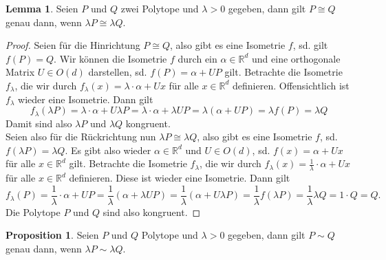 \documentclass[11pt,titlepage]{article}
\newcommand{\setR}{\mathbb{R}}
\theoremstyle{definition}
\newtheorem{proposition}[theorem]{Proposition}
\newtheorem{lemma}[theorem]{Lemma}
\theoremstyle{remark}
\begin{document}
	\begin{lemma} \label{lemma:dilkong}
		Seien $P$ und $Q$ zwei Polytope und $\lambda>0$ gegeben, dann gilt 
		$P\cong Q$ genau dann, wenn $\lambda P\cong \lambda Q$.
	\end{lemma}
	
	\begin{proof}
		Seien für die Hinrichtung $P\cong Q$, also gibt es eine Isometrie 
		$f$, sd. gilt $f(P)=Q$. Wir können die Isometrie $f$ durch ein $\alpha\in
		\setR^d$ und eine orthogonale Matrix $U\in O(d)$ darstellen, sd. 
		$f(P)=\alpha + UP$ gilt. Betrachte die Isometrie $f_{\lambda}$, die wir 
		durch $f_{\lambda}(x)=\lambda\cdot \alpha +Ux$ für alle $x\in\setR^d$ definieren. 
		Offensichtlich ist $f_{\lambda}$ wieder eine Isometrie. 
		Dann gilt
		\[f_{\lambda}(\lambda P)=\lambda\cdot \alpha+U \lambda P =\lambda\cdot 
		\alpha+\lambda U P =\lambda(\alpha+ U P)=\lambda f(P)=\lambda Q\]
		Damit sind also $\lambda P$ und $\lambda Q$ kongruent. \\
		Seien also für die Rückrichtung nun $\lambda P\cong \lambda Q$, also 
		gibt es eine Isometrie $f$, sd. $f(\lambda P)=\lambda Q$. Es gibt 
		also wieder $\alpha\in\setR^d$ und $U\in O(d)$, sd. 
		$f(x)=\alpha + Ux$ für alle $x\in\setR^d$ gilt. Betrachte die Isometrie 
		$f_{\lambda}$, die wir durch 
		$f_{\lambda}(x)=\frac{1}{\lambda}\cdot \alpha +U x$ für alle $x\in\setR^d$ 
		definieren. Diese ist wieder eine Isometrie. Dann gilt 
		\[f_{\lambda}(P)=\frac{1}{\lambda}\cdot \alpha +U P 
		=\frac{1}{\lambda}(\alpha+\lambda U P)
		=\frac{1}{\lambda}(\alpha + U \lambda P)
		=\frac{1}{\lambda} f(\lambda P)=\frac{1}{\lambda} \lambda Q =1\cdot Q=Q.\]
		Die Polytope $P$ und $Q$ sind also kongruent.
	\end{proof}
	
	\begin{proposition} \label{prop:dilzerl}
		Seien $P$ und $Q$ Polytope und $\lambda>0$ gegeben, dann gilt 
		$P\sim Q$ genau dann, wenn $\lambda P\sim \lambda Q$.
	\end{proposition}
	
\end{document}
